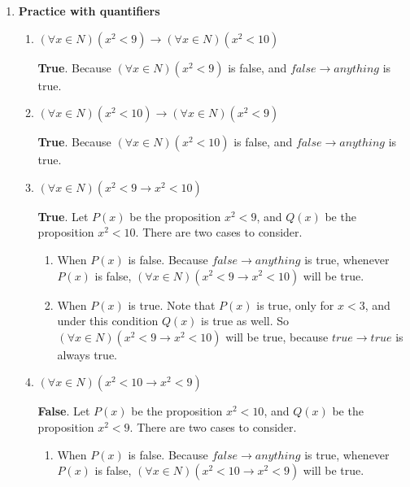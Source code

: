 \documentclass[11pt]{article}
\begin{document}
\begin{enumerate}
\begin{enumerate}
		\end{enumerate}
		
		\item \textbf{Practice with quantifiers}
		
		\begin{enumerate}
			
			\item $(\forall x \in N)(x^2 < 9) \rightarrow (\forall x \in N)(x^2 < 10) $
			
			\textbf{True}. Because $(\forall x \in N)(x^2 < 9)$ is false, and $false \rightarrow anything$ is true. \\
			
			\item $(\forall x \in N)(x^2 < 10) \rightarrow (\forall x \in N)(x^2 < 9) $
			
			\textbf{True}. Because $(\forall x \in N)(x^2 < 10)$ is false, and $false \rightarrow anything$ is true.\\
			
			\item $(\forall x \in N)(x^2 < 9 \rightarrow x^2 < 10) $
			
			\textbf{True}. Let $P(x)$ be the proposition $x^2 < 9$, and $Q(x)$ be the proposition $x^2 < 10$. There are two cases to consider. \\
			\begin{enumerate}
				\item When $P(x)$ is false. Because $false \rightarrow anything$ is true, whenever $P(x)$ is false, $(\forall x \in N)(x^2 < 9 \rightarrow x^2 < 10) $ will be true. 
				
				\item When $P(x)$ is true. Note that $P(x)$ is true, only for $x < 3$, and under this condition $Q(x)$ is true as well. So $(\forall x \in N)(x^2 < 9 \rightarrow x^2 < 10) $ will be true, because $true \rightarrow true$ is always true. 
			\end{enumerate}
			
			
			\item $(\forall x \in N)(x^2 < 10 \rightarrow x^2 < 9) $
			
			\textbf{False}. Let $P(x)$ be the proposition $x^2 < 10$, and $Q(x)$ be the proposition $x^2 < 9$. There are two cases to consider.\\
			
			\begin{enumerate}
				\item When $P(x)$ is false. Because $false \rightarrow anything$ is true, whenever $P(x)$ is false, $(\forall x \in N)(x^2 < 10 \rightarrow x^2 < 9) $ will be true. 
				

\end{enumerate}
\end{enumerate}
\end{enumerate}
\end{document}
